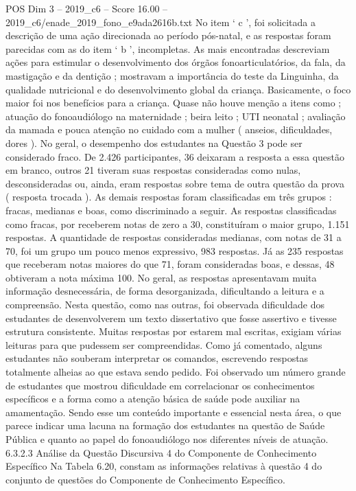 \begin{textsample}{POS Dim 3 – 2019\_c6 – Score 16.00 – 2019\_c6/enade\_2019\_fono\_e9ada2616b.txt}
No item ‘ c ’, foi solicitada a descrição de uma ação direcionada ao período pós-natal, e as respostas foram parecidas com as do item ‘ b ’, incompletas.
As mais encontradas descreviam ações para estimular o desenvolvimento dos órgãos fonoarticulatórios, da fala, da mastigação e da dentição ; mostravam a importância do teste da Linguinha, da qualidade nutricional e do desenvolvimento global da criança.
Basicamente, o foco maior foi nos benefícios para a criança.
Quase não houve menção a itens como ; atuação do fonoaudiólogo na maternidade ; beira leito ; UTI neonatal ; avaliação da mamada e pouca atenção no cuidado com a mulher ( anseios, dificuldades, dores ).
No geral, o desempenho dos estudantes na Questão 3 pode ser considerado fraco.
De 2.426 participantes, 36 deixaram a resposta a essa questão em branco, outros 21 tiveram suas respostas consideradas como nulas, desconsideradas ou, ainda, eram respostas sobre tema de outra questão da prova ( resposta trocada ).
As demais respostas foram classificadas em três grupos : fracas, medianas e boas, como discriminado a seguir.
As respostas classificadas como fracas, por receberem notas de zero a 30, constituíram o maior grupo, 1.151 respostas.
A quantidade de respostas consideradas medianas, com notas de 31 a 70, foi um grupo um pouco menos expressivo, 983 respostas.
Já as 235 respostas que receberam notas maiores do que 71, foram consideradas boas, e dessas, 48 obtiveram a nota máxima 100.
No geral, as respostas apresentavam muita informação desnecessária, de forma desorganizada, dificultando a leitura e a compreensão.
Nesta questão, como nas outras, foi observada dificuldade dos estudantes de desenvolverem um texto dissertativo que fosse assertivo e tivesse estrutura consistente.
Muitas respostas por estarem mal escritas, exigiam várias leituras para que pudessem ser compreendidas.
Como já comentado, alguns estudantes não souberam interpretar os comandos, escrevendo respostas totalmente alheias ao que estava sendo pedido.
Foi observado um número grande de estudantes que mostrou dificuldade em correlacionar os conhecimentos específicos e a forma como a atenção básica de saúde pode auxiliar na amamentação.
Sendo esse um conteúdo importante e essencial nesta área, o que parece indicar uma lacuna na formação dos estudantes na questão de Saúde Pública e quanto ao papel do fonoaudiólogo nos diferentes níveis de atuação. 6.3.2.3 Análise da Questão Discursiva 4 do Componente de Conhecimento Específico Na Tabela 6.20, constam as informações relativas à questão 4 do conjunto de questões do Componente de Conhecimento Específico.

\end{textsample}
